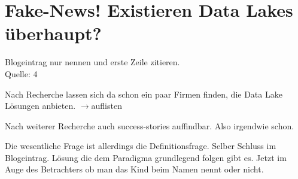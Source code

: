 \documentclass[
10pt, %
a4paper, %
oneside, %
headinclude,footinclude, %
BCOR5mm, %
]{scrartcl}
\begin{document}
\section{Fake-News! Existieren Data Lakes überhaupt?}
Blogeintrag nur nennen und erste Zeile zitieren.\\
Quelle: 4

Nach Recherche lassen sich da schon ein paar Firmen finden, die Data Lake Lösungen anbieten.
$\rightarrow$auflisten


Nach weiterer Recherche auch success-stories auffindbar. Also irgendwie schon.


Die wesentliche Frage ist allerdings die Definitionsfrage. Selber Schluss im Blogeintrag. Lösung die dem Paradigma grundlegend folgen gibt es. Jetzt im Auge des Betrachters ob man das Kind beim Namen nennt oder nicht.


\pagebreak


\renewcommand{\refname}{\spacedlowsmallcaps{Literatur/Quellen}} %




\end{document}
